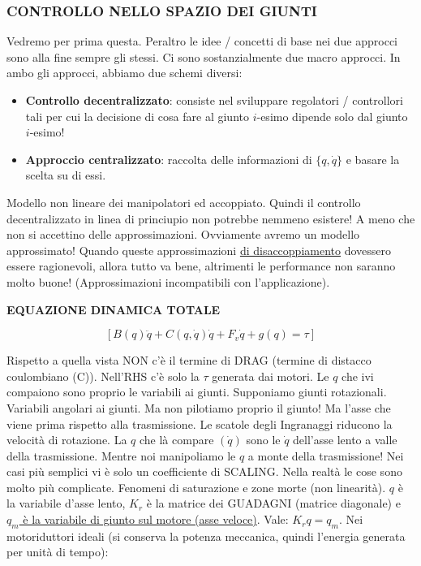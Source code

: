 \subsubsection{CONTROLLO NELLO SPAZIO DEI GIUNTI}

Vedremo per prima questa. Peraltro le idee / concetti di base nei due approcci sono alla fine sempre gli stessi. Ci sono sostanzialmente due macro approcci. In ambo gli approcci, abbiamo due schemi diversi:

\begin{itemize}

\item{\textbf{Controllo decentralizzato}}: consiste nel sviluppare regolatori / controllori tali per cui la decisione di cosa fare al giunto $i$-esimo dipende solo dal giunto $i$-esimo!
\item{\textbf{Approccio centralizzato}}: raccolta delle informazioni di $\{q,\dot{q}\}$ e basare la scelta su di essi.

\end{itemize}

Modello non lineare dei manipolatori ed accoppiato. Quindi il controllo decentralizzato in linea di princiupio non potrebbe nemmeno esistere! A meno che non si accettino delle approssimazioni. Ovviamente avremo un modello approssimato! Quando queste approssimazioni \underline{di disaccoppiamento} dovessero essere ragionevoli, allora tutto va bene, altrimenti le performance non saranno molto buone! (Approssimazioni incompatibili con l'applicazione).

\begin{defn}{\textbf{EQUAZIONE DINAMICA TOTALE}}

\[
	[B(q)\ddot{q} + C(q,\dot{q})\dot{q} + F_v\dot{q} + g(q) = \tau]
\]

\end{defn}

Rispetto a quella vista NON c'è il termine di DRAG (termine di distacco coulombiano (C)). Nell'RHS c'è solo la $\tau$ generata dai motori. Le $q$ che ivi compaiono sono proprio le variabili ai giunti. Supponiamo giunti rotazionali. Variabili angolari ai giunti. Ma non pilotiamo proprio il giunto! Ma l'asse che viene prima rispetto alla trasmissione. Le scatole degli Ingranaggi riducono la velocità di rotazione. La $q$ che là compare $(\dot{q})$ sono le $\dot{q}$ dell'asse lento a valle della trasmissione. Mentre noi manipoliamo le $q$ a monte della trasmissione! Nei casi più semplici vi è solo un coefficiente di SCALING. Nella realtà le cose sono molto più complicate. Fenomeni di saturazione e zone morte (non linearità). $q$ è la variabile d'asse lento, $K_r$ è la matrice dei GUADAGNI (matrice diagonale) e \underline{$q_m$ è la variabile di giunto sul motore (\underline{asse veloce})}. Vale: $K_rq = q_m$. Nei motoriduttori ideali (si conserva la potenza meccanica, quindi l'energia generata per unità di tempo):

